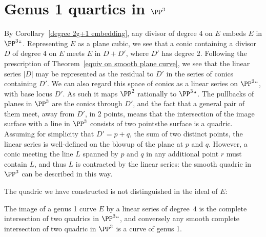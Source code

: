 \section{Genus 1 quartics in $\PP^3$} \label{g=1 in P3}

By Corollary~\ref{degree 2g+1 embedding}, any
divisor of degree 4
%
on
$E$ embeds $E$ in $\PP^3` `$. Representing $E$ as a plane cubic, we
see that a conic containing a divisor $D$ of degree 4 on $E$ meets $E$
in $D+D'$, where $D'$ has degree 2.
Following the prescription
of Theorem~\ref{equiv on smooth plane curve}, we see that the linear series $|D|$ may be represented as the residual to
$D'$ in the
series of conics containing $D'$. We can also regard this space of conics as a linear series on $\PP^2` `$, with base locus $D'$.
As such it maps $\PP^2$ rationally to $\PP^3` `$. The pullbacks of planes in $\PP^3$ are the conics through $D'$, and the fact that a general pair of them meet,
away from $D'$, in 2 points, means that the intersection of the image surface with a line in $\PP^3$ consists of two points\emdash the surface is a quadric. Assuming for simplicity that $D' = p+q$, the sum of two distinct points, the linear series is well-defined on the blowup of the plane at $p$ and $q$. However, a conic meeting the line $L$ spanned by $p$ and $q$ in any additional point $r$ must contain $L$, and thus $L$ is contracted by the linear series: the smooth quadric in $\PP^3$ can be described in this way.

The quadric we have constructed is not distinguished in the ideal of $E$:

\begin{proposition}\label{elliptic quartic as complete intersection}
 The image of a genus 1 curve $E$ by a
%
linear series of degree~$4$
%
 is the complete intersection of two quadrics in $\PP^3` `$, and conversely any  smooth complete intersection of two quadric
 in $\PP^3$ is a curve of
 genus 1.
\end{proposition}

